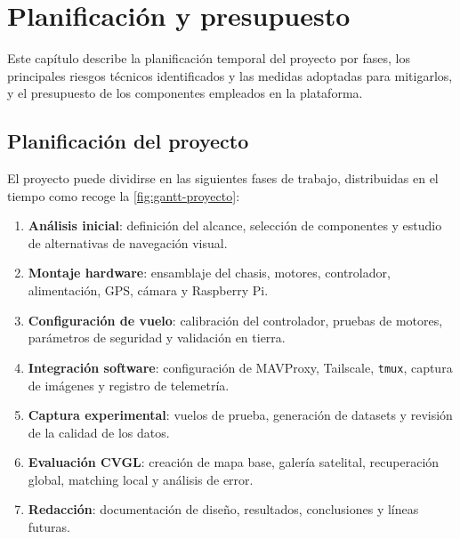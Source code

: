 
\chapter{Planificación y presupuesto}
\label{cap:planificacion-presupuesto}

\begin{Resumen}
Este capítulo describe la planificación temporal del proyecto por fases, los principales riesgos técnicos identificados y las medidas adoptadas para mitigarlos, y el presupuesto de los componentes empleados en la plataforma.
\end{Resumen}

\section{Planificación del proyecto}
\label{sec:planificacion-proyecto}

El proyecto puede dividirse en las siguientes fases de trabajo, distribuidas en el tiempo como recoge la \autoref{fig:gantt-proyecto}:

\begin{enumerate}
\item \textbf{Análisis inicial}: definición del alcance, selección de componentes y estudio de alternativas de navegación visual.
\item \textbf{Montaje hardware}: ensamblaje del chasis, motores, controlador, alimentación, GPS, cámara y Raspberry Pi.
\item \textbf{Configuración de vuelo}: calibración del controlador, pruebas de motores, parámetros de seguridad y validación en tierra.
\item \textbf{Integración software}: configuración de MAVProxy, Tailscale, \texttt{tmux}, captura de imágenes y registro de telemetría.
\item \textbf{Captura experimental}: vuelos de prueba, generación de datasets y revisión de la calidad de los datos.
\item \textbf{Evaluación CVGL}: creación de mapa base, galería satelital, recuperación global, matching local y análisis de error.
\item \textbf{Redacción}: documentación de diseño, resultados, conclusiones y líneas futuras.
\end{enumerate}

